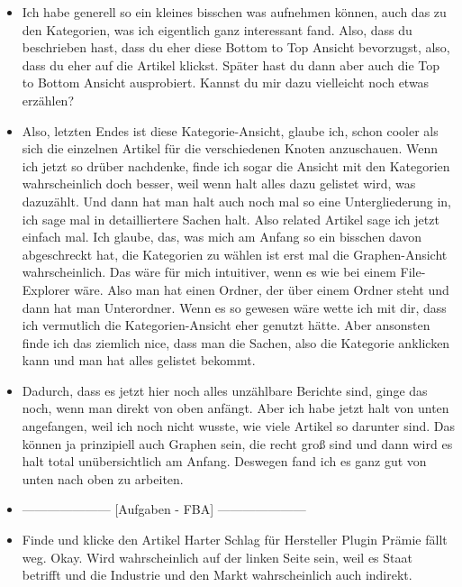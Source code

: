 {\begin{itemize}[]
            \item {} Ich habe generell so ein kleines bisschen was aufnehmen können, auch das zu den Kategorien, was ich eigentlich ganz interessant fand.
                  Also, dass du beschrieben hast, dass du eher diese Bottom to Top Ansicht bevorzugst, also, dass du eher auf die Artikel klickst.
                  Später hast du dann aber auch die Top to Bottom Ansicht ausprobiert.
                  Kannst du mir dazu vielleicht noch etwas erzählen?
            \item {} Also, letzten Endes ist diese Kategorie-Ansicht, glaube ich, schon cooler als sich die einzelnen Artikel für die verschiedenen Knoten anzuschauen.
                  Wenn ich jetzt so drüber nachdenke, finde ich sogar die Ansicht mit den Kategorien wahrscheinlich doch besser, weil wenn halt alles dazu gelistet wird, was dazuzählt.
                  Und dann hat man halt auch noch mal so eine Untergliederung in, ich sage mal in detailliertere Sachen halt. Also related Artikel sage ich jetzt einfach mal.
                  Ich glaube, das, was mich am Anfang so ein bisschen davon abgeschreckt hat, die Kategorien zu wählen ist erst mal die Graphen-Ansicht wahrscheinlich.
                  Das wäre für mich intuitiver, wenn es wie bei einem File-Explorer wäre.
                  Also man hat einen Ordner, der über einem Ordner steht und dann hat man Unterordner.
                  Wenn es so gewesen wäre wette ich mit dir, dass ich vermutlich die Kategorien-Ansicht eher genutzt hätte.
                  Aber ansonsten finde ich das ziemlich nice, dass man die Sachen, also die Kategorie anklicken kann und man hat alles gelistet bekommt.
            \item {} Dadurch, dass es jetzt hier noch alles unzählbare Berichte sind, ginge das noch, wenn man direkt von oben anfängt.
                  Aber ich habe jetzt halt von unten angefangen, weil ich noch nicht wusste, wie viele Artikel so darunter sind.
                  Das können ja prinzipiell auch Graphen sein, die recht groß sind und dann wird es halt total unübersichtlich am Anfang.
                  Deswegen fand ich es ganz gut von unten nach oben zu arbeiten.
            \item {---------------------} [Aufgaben - FBA] {---------------------}
            \item {} Finde und klicke den Artikel \flqq Harter Schlag für Hersteller Plugin Prämie fällt weg\frqq{}.
                  Okay. Wird wahrscheinlich auf der linken Seite sein, weil es Staat betrifft und die Industrie und den Markt wahrscheinlich auch indirekt.

\end{itemize}}
